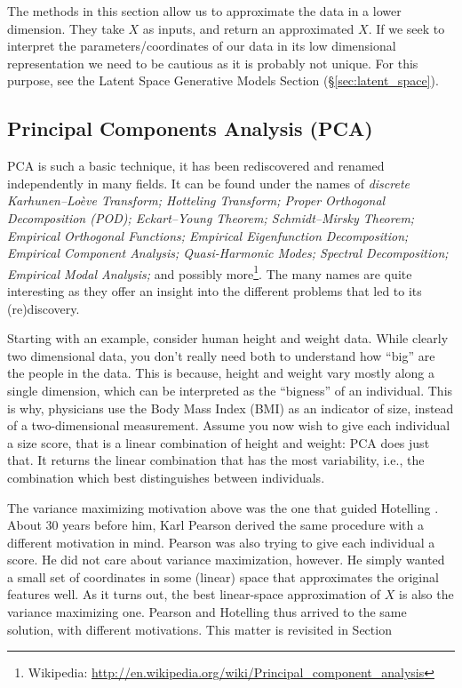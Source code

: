 \begin{remark}
 The methods in this section allow us to approximate the data in a lower dimension. 
 They take $X$ as inputs, and return an approximated $X$. 
 If we seek to interpret the parameters/coordinates of our data in its low dimensional representation we need to be cautious as it is probably not unique. For this purpose, see the Latent Space Generative Models Section (\S\ref{sec:latent_space}).
\end{remark}




\subsection{Principal Components Analysis (PCA)}
\label{sec:pca}

PCA is such a basic technique, it has been rediscovered and renamed independently in many fields. 
It can be found under the names of \emph{discrete Karhunen–Loève Transform; Hotteling Transform; Proper Orthogonal Decomposition (POD); Eckart–Young Theorem; Schmidt–Mirsky Theorem;  Empirical Orthogonal Functions; Empirical Eigenfunction Decomposition;  Empirical Component Analysis;  Quasi-Harmonic Modes;  Spectral Decomposition;  Empirical Modal Analysis;} and possibly more\footnote{Wikipedia: \url{http://en.wikipedia.org/wiki/Principal_component_analysis} }.
The many names are quite interesting as they offer an insight into the different problems that led to its (re)discovery.

Starting with an example, consider human height and weight data. 
While clearly two dimensional data, you don't really need both to understand how ``big'' are the people in the data. 
This is because, height and weight vary mostly along a single dimension, which can be interpreted as the ``bigness'' of an individual. 
This is why, physicians use the Body Mass Index (BMI) as an indicator of size, instead of a two-dimensional measurement.
Assume you now wish to give each individual a size score, that is a linear combination of height and weight: PCA does just that. It returns the linear combination that has the most variability, i.e., the combination which best distinguishes between individuals. 

The variance maximizing motivation above was the one that guided Hotelling \citep{hotelling_analysis_1933}.
About $30$ years before him, Karl Pearson \citep{pearson_liii._1901} derived the same procedure with a different motivation in mind. Pearson was also trying to give each individual a score. He did not care about variance maximization, however. He simply wanted a small set of coordinates in some (linear) space that approximates the original features well. As it turns out, the best linear-space approximation of $X$ is also the variance maximizing one. Pearson and Hotelling thus arrived to the same solution, with different motivations. This matter is revisited in Section 





